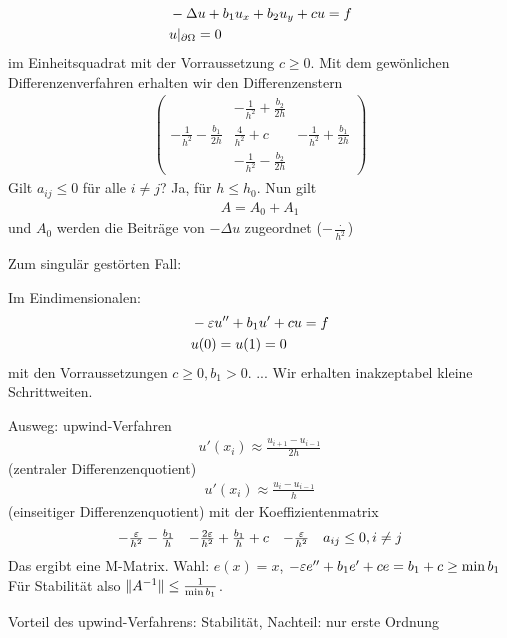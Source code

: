 \begin{beispiel}
  \begin{align*}
&    -\Delta u + b_1 u_x + b_2 u_y + cu = f \\
&u|_{\partial \Omega} = 0
  \end{align*}
im Einheitsquadrat mit der Vorraussetzung $c \geq 0$. Mit dem gewönlichen Differenzenverfahren erhalten wir den Differenzenstern
\begin{align*}
  \begin{pmatrix}
    & - \frac 1{h^2} + \frac {b_2}{2h} &\\ 
     - \frac 1{h^2} - \frac {b_1}{2h}     & \frac  4{h^2} + c& - \frac 1{h^2} + \frac {b_1}{2h} \\  
    & - \frac 1{h^2} - \frac {b_2}{2h} &
  \end{pmatrix}
\end{align*}
Gilt $a_{ij} \leq 0$ für alle $i \neq j$? Ja, für $h\leq h_0$.
Nun gilt 
\begin{align*}
  A = A_0 + A_1
\end{align*}
und $A_0 $ werden die Beiträge von $-\Delta u$ zugeordnet ($-\frac \cdot {h^2}$)


\end{beispiel}
\begin{beispiel}
  Zum singulär gestörten Fall: 

Im Eindimensionalen:
\begin{align*}
&  - \varepsilon u'' + b_1 u' + cu = f\\
&u(0) = u(1) = 0 
\end{align*}
mit den Vorraussetzungen $c \geq 0, b_1> 0$.
... Wir erhalten inakzeptabel kleine Schrittweiten.

Ausweg: upwind-Verfahren
\begin{align*}
  u'(x_i) \approx \frac{u_{i+1}- u_{i-1}}{2h}
\end{align*} (zentraler Differenzenquotient)
\begin{align*}
  u'(x_i) \approx \frac{u_{i}- u_{i-1}}{h}
\end{align*} (einseitiger Differenzenquotient)
mit der Koeffizientenmatrix
\begin{align*}
  \begin{matrix}
    -\frac {\varepsilon}{h^2} - \frac {b_1} h &     -\frac {2\varepsilon}{h^2} + \frac {b_1} h +c&     -\frac {\varepsilon}{h^2} 
  \end{matrix} \quad a_{ij} \leq 0, i \neq j
\end{align*}
Das ergibt eine M-Matrix. Wahl: $e(x) = x$, $- \varepsilon e'' + b_1e' + ce = b_1 + c \geq \min b_1$
Für Stabilität also $\|A^{-1} \| \leq \frac 1 {\min b_1}$.

Vorteil des upwind-Verfahrens: Stabilität, Nachteil: nur erste Ordnung
\end{beispiel}

